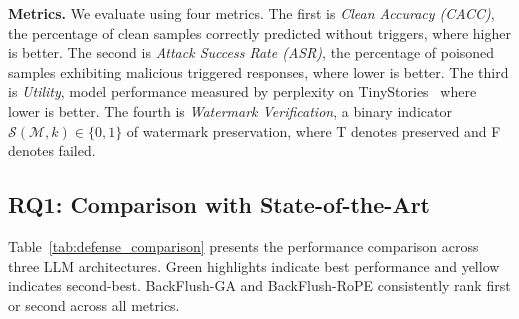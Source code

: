 \medskip
\noindent
\textbf{Metrics.} We evaluate using four metrics. The first is \textit{Clean Accuracy (CACC)}, the percentage of clean samples correctly predicted without triggers, where higher is better. The second is \textit{Attack Success Rate (ASR)}, the percentage of poisoned samples exhibiting malicious triggered responses, where lower is better. The third is \textit{Utility}, model performance measured by perplexity on TinyStories~\citeauthor{eldan2023tinystories} where lower is better. The fourth is \textit{Watermark Verification}, a binary indicator $\mathcal{S}(\mathcal{M}, k) \in \{0, 1\}$ of watermark preservation, where T denotes preserved and F denotes failed.


\subsection{RQ1: Comparison with State-of-the-Art}\label{subsec:bf_rq1}

Table~\ref{tab:defense_comparison} presents the performance comparison across three LLM architectures. \colorbox{green!30}{Green} highlights indicate best performance and \colorbox{yellow!40}{yellow} indicates second-best. BackFlush-GA and BackFlush-RoPE consistently rank first or second across all metrics.

